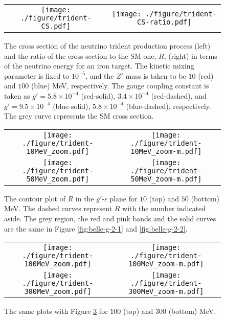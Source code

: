 \documentclass[preprint,amsmath,amssymb,superscriptaddress,nofootinbib]{revtex4}
\begin{document}
\begin{figure}[t]
\begin{center}
\begin{tabular}{cc}
\texttt{[image: ./figure/trident-CS.pdf]}
&
\texttt{[image: ./figure/trident-CS-ratio.pdf]} \\
%
\end{tabular}
\end{center}
\caption{ 
The cross section of the neutrino trident production process (left) and the ratio of the cross section to the 
SM one, $R$,  (right) in terms of the neutrino energy for an iron target.
%
The kinetic mixing parameter is fixed to $10^{-5}$, and the $Z'$ mass is taken to be $10$ (red) and $100$ (blue) MeV, 
respectively.
%
The gauge coupling constant is taken as $g'=5.8 \times 10^{-4}$ (red-solid), $3.4 \times 10^{-4}$ (red-dashed), 
and $g'=9.5 \times 10^{-4}$ (blue-solid), $5.8 \times 10^{-4}$ (blue-dashed), respectively. 
The grey curve represents the SM cross section.
}
\label{fig:trident-CS}
\end{figure}


\begin{figure}[t]
\begin{center}
\begin{tabular}{cc}
\texttt{[image: ./figure/trident-10MeV\_zoom.pdf]}
&
\texttt{[image: ./figure/trident-10MeV\_zoom-m.pdf]} \vspace{2mm} \\
%
\texttt{[image: ./figure/trident-50MeV\_zoom.pdf]}
&
\texttt{[image: ./figure/trident-50MeV\_zoom-m.pdf]} \\
%
\end{tabular}
\end{center}
\caption{ 
The contour plot of $R$ in the $g'$-$\epsilon$ plane for $10$ (top) and $50$ (bottom) MeV. The dashed curves 
represent $R$ with the number indicated aside. The grey region, the red and pink bands and the solid curves 
are the same in Figure \ref{fig:belle-g-2-1} and \ref{fig:belle-g-2-2}.
}
\label{fig:trident-1}
\end{figure}


\begin{figure}[t]
\begin{center}
\begin{tabular}{cc}
\texttt{[image: ./figure/trident-100MeV\_zoom.pdf]}
&
\texttt{[image: ./figure/trident-100MeV\_zoom-m.pdf]} \vspace{2mm} \\
%
\texttt{[image: ./figure/trident-300MeV\_zoom.pdf]}
&
\texttt{[image: ./figure/trident-300MeV\_zoom-m.pdf]} \\
%
\end{tabular}
\end{center}
\caption{ 
The same plots with Figure \ref{fig:trident-2} for $100$ (top) and $300$ (bottom) MeV.
}
\label{fig:trident-2}
\end{figure}
\end{document}
